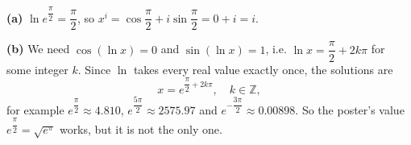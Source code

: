 \textbf{(a)} $\ln e^{\dfrac\pi2}=\dfrac\pi2$, so $x^i=\cos\dfrac\pi2+i\sin\dfrac\pi2=0+i=i$.

\textbf{(b)} We need $\cos(\ln x)=0$ and $\sin(\ln x)=1$, i.e. $\ln x=\dfrac\pi2+2k\pi$ for some integer $k$. Since $\ln$ takes every real value exactly once, the solutions are
\[\boxed{x=e^{\dfrac\pi2+2k\pi},\quad k\in\mathbb Z},\]
for example $e^{\dfrac\pi2}\approx4.810$, $e^{\dfrac{5\pi}{2}}\approx2575.97$ and $e^{-\dfrac{3\pi}{2}}\approx0.00898$. So the poster's value $e^{\dfrac\pi2}=\sqrt{e^\pi}$ works, but it is not the only one.
